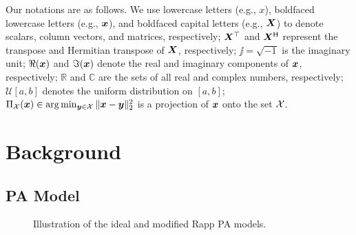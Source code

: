 \documentclass[10pt,twocolumn,twoside]{IEEEtran}
\begin{document}
Our notations are as follows.
We use lowercase letters (e.g., $x$), boldfaced lowercase letters (e.g., ${\bm x}$), and boldfaced capital letters (e.g., ${\bm X}$) to denote scalars, column vectors, and matrices, respectively;
${\bm X}^\top$ and ${\bm X}^{\mathsf{H}}$ represent the transpose and Hermitian transpose of ${\bm X}$, respectively;
$\jj = \sqrt{-1}$ is the imaginary unit;
$\Re({\bm x})$ and $\Im({\bm x})$ denote the real and imaginary components of ${\bm x}$, respectively;
$\mathbb{R}$ and $\mathbb{C}$ are the sets of all real and complex numbers, respectively;
$\mathcal{U}{[a,b]}$ denotes the uniform distribution on $[a,b]$;
$\Pi_{\mathcal{X}}({\bm x}) \in \arg \min_{{\bm y} \in \mathcal{X}} \|{\bm x}-{\bm y}\|_2^2$ is a projection of ${\bm x}$ onto the set $\mathcal{X}$.



\section{Background}




\subsection{PA Model}
\label{sec:PA_mod}


\begin{figure}[t]
\centering
{}
\caption{Illustration of the ideal and modified Rapp PA models.}
\label{fig:PA_response}
\end{figure}
\end{document}
